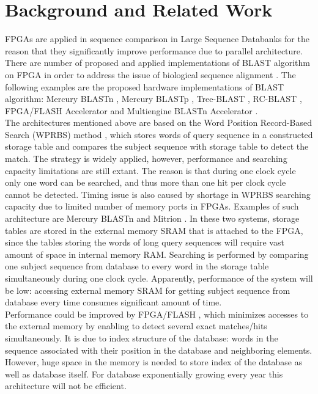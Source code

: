 \section{Background and Related Work}
\label{sec:background}

\quad FPGAs are applied in sequence comparison in Large Sequence Databanks for the reason that they significantly improve performance due to parallel architecture. There are number of proposed and applied implementations of BLAST algorithm on FPGA in order to address the issue of biological sequence alignment \cite{oliver2005hyper}. The following examples are the proposed hardware implementations of BLAST algorithm: Mercury BLASTn \cite{buhler2007mercury}, Mercury BLASTp \cite{harris2007banded}, Tree-BLAST \cite{herbordt2006single}, RC-BLAST \cite{datta2009}, FPGA/FLASH Accelerator \cite{lavenier2007reconfigurable} and Multiengine BLASTn Accelerator \cite{sotiriades2007design}. 
\\

The architectures mentioned above are based on the Word Position Record-Based Search (WPRBS) method \cite{guo2012systolic}, which stores words of query sequence in a constructed storage table and compares the subject sequence with storage table to detect the match. The strategy is widely applied, however, performance and searching capacity limitations are still extant. The reason is that during one clock cycle only one word can be searched, and thus more than one hit per clock cycle cannot be detected. Timing issue is also caused by shortage in WPRBS searching capacity due to limited number of memory ports in FPGAs. Examples of such architecture are Mercury BLASTn \cite{buhler2007mercury} and Mitrion \cite{guo2012systolic}. In these two systems, storage tables are stored in the external memory SRAM that is attached to the FPGA, since the tables storing the words of long query sequences will require vast amount of space in internal memory RAM. Searching is performed by comparing one subject sequence from database to every word in the storage table simultaneously during one clock cycle. Apparently, performance of the system will be low: accessing external memory SRAM for getting subject sequence from database every time consumes significant amount of time.    
\\    

Performance could be improved by FPGA/FLASH \cite{lavenier2007reconfigurable}, which minimizes accesses to the external memory by enabling to detect several exact matches/hits simultaneously. It is due to index structure of the database: words in the sequence associated with their position in the database and neighboring elements. However, huge space in the memory is needed to store index of the database as well as database itself. For database exponentially growing every year this architecture will not be efficient. 
\\


